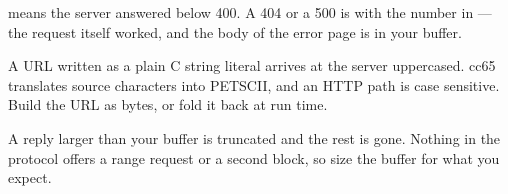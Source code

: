  means the server answered below 400. A 404 or a 500 is
 with the number in
 --- the request itself worked, and the body of
the error page is in your buffer.

\begin{warning}
A URL written as a plain C string literal arrives at the server uppercased.
cc65 translates source characters into PETSCII, and an HTTP path is case
sensitive. Build the URL as bytes, or fold it back at run time.
\end{warning}

\begin{note}
A reply larger than your buffer is truncated and the rest is gone. Nothing in
the protocol offers a range request or a second block, so size the buffer for
what you expect.
\end{note}
